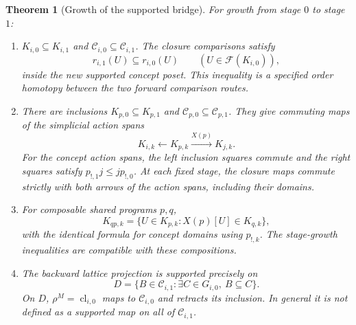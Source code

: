 \documentclass[11pt]{article}
\newtheorem{theorem}{Theorem}[section]
\theoremstyle{remark}\newtheorem{remark}[theorem]{Remark}
\newcommand{\cl}{\operatorname{cl}}
\begin{document}
\begin{theorem}[Growth of the supported bridge]
For growth from stage $0$ to stage $1$:
\begin{enumerate}
\item $K_{i,0}\subseteq K_{i,1}$ and
$\mathcal C_{i,0}\subseteq\mathcal C_{i,1}$.
The closure comparisons satisfy
\[
 r_{i,1}(U)\subseteq r_{i,0}(U)
 \qquad(U\in\mathcal F(K_{i,0})),
\]
inside the new supported concept poset. This inequality is a specified
order homotopy between the two forward comparison routes.
\item There are inclusions $K_{p,0}\subseteq K_{p,1}$ and
$\mathcal C_{p,0}\subseteq\mathcal C_{p,1}$. They give commuting
maps of the simplicial action spans
\[
 K_{i,k}\longleftarrow K_{p,k}\xrightarrow{X(p)}K_{j,k}.
\]
For the concept action spans, the left inclusion squares commute and
the right squares satisfy $p_{!,1}j\leq jp_{!,0}$. At each fixed
stage, the closure maps commute strictly with both arrows of the
action spans, including their domains.
\item For composable shared programs $p,q$,
\[
 K_{qp,k}=\{U\in K_{p,k}:X(p)[U]\in K_{q,k}\},
\]
with the identical formula for concept domains using $p_{!,k}$.
The stage-growth inequalities are compatible with these compositions.
\item The backward lattice projection is supported precisely on
\[
 D=\{B\in\mathcal C_{i,1}:\exists C\in G_{i,0},\ B\subseteq C\}.
\]
On $D$, $\rho^M=\cl_{i,0}$ maps to $\mathcal C_{i,0}$ and
retracts its inclusion. In general it is not defined as a supported
map on all of $\mathcal C_{i,1}$.
\end{enumerate}
\end{theorem}
\end{document}

